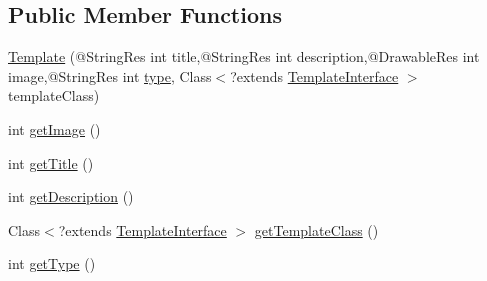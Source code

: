 \subsection*{Public Member Functions}
\begin{DoxyCompactItemize}
\item 
\hyperlink{enumorg_1_1buildmlearn_1_1toolkit_1_1model_1_1Template_ac5659f42cc419f9e8a0845591efe9a14}{Template} (@String\-Res int title,@String\-Res int description,@Drawable\-Res int image,@String\-Res int \hyperlink{enumorg_1_1buildmlearn_1_1toolkit_1_1model_1_1Template_a92b84675089efb1f591b3342793df5c4}{type}, Class$<$?extends \hyperlink{interfaceorg_1_1buildmlearn_1_1toolkit_1_1model_1_1TemplateInterface}{Template\-Interface} $>$ template\-Class)
\item 
int \hyperlink{enumorg_1_1buildmlearn_1_1toolkit_1_1model_1_1Template_a58fe17e72b35d2e3caf83636e477ee1f}{get\-Image} ()
\item 
int \hyperlink{enumorg_1_1buildmlearn_1_1toolkit_1_1model_1_1Template_a7243ccbb7b13ee22a953423bf6059512}{get\-Title} ()
\item 
int \hyperlink{enumorg_1_1buildmlearn_1_1toolkit_1_1model_1_1Template_abacc16481f1b0c6df91e4722aa05e769}{get\-Description} ()
\item 
Class$<$?extends \hyperlink{interfaceorg_1_1buildmlearn_1_1toolkit_1_1model_1_1TemplateInterface}{Template\-Interface} $>$ \hyperlink{enumorg_1_1buildmlearn_1_1toolkit_1_1model_1_1Template_aac65cbf78fd00d3ce6d3e1ec7eb83761}{get\-Template\-Class} ()
\item 
int \hyperlink{enumorg_1_1buildmlearn_1_1toolkit_1_1model_1_1Template_aea52d308cd996ad5927028269e2c6c6d}{get\-Type} ()
\end{DoxyCompactItemize}
